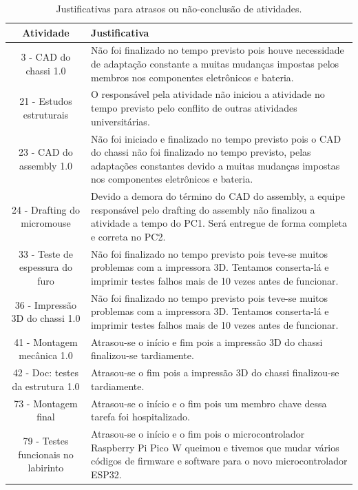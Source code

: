 \begin{landscape}
\clearpage
\begin{table}[htpb]
\begin{center}
\caption{Justificativas para atrasos ou não-conclusão de atividades.}
\begin{tabular}{|c|p{15cm}|} \hline
\textbf{Atividade} & \textbf{Justificativa}  \\ \hline 
    3 - CAD do chassi 1.0 &
    Não foi finalizado no tempo previsto pois houve necessidade de adaptação constante a muitas mudanças impostas pelos membros nos componentes eletrônicos e bateria.\\ \hline
    21 - Estudos estruturais &
    O responsável pela atividade não iniciou a atividade no tempo previsto pelo conflito de outras atividades universitárias. \\ \hline
    23 - CAD do assembly 1.0 &
    Não foi iniciado e finalizado no tempo previsto pois o CAD do chassi não foi finalizado no tempo previsto, pelas adaptações constantes devido a muitas mudanças impostas nos componentes eletrônicos e bateria. \\ \hline
    24 - Drafting do micromouse &
    Devido a demora do término do CAD do assembly, a equipe responsável pelo drafting do assembly não finalizou a atividade a tempo do PC1. Será entregue de forma completa e correta no PC2. \\ \hline
    33 - Teste de espessura do furo &
    Não foi finalizado no tempo previsto pois teve-se muitos problemas com a impressora 3D. Tentamos conserta-lá e imprimir testes falhos mais de 10 vezes antes de funcionar. \\ \hline
    36 - Impressão 3D do chassi 1.0 &
    Não foi finalizado no tempo previsto pois teve-se muitos problemas com a impressora 3D. Tentamos conserta-lá e imprimir testes falhos mais de 10 vezes antes de funcionar.  \\ \hline
    41 - Montagem mecânica 1.0 &
    Atrasou-se o início e fim pois a impressão 3D do chassi finalizou-se tardiamente. \\ \hline
    42 - Doc: testes da estrutura 1.0 &
    Atrasou-se o fim pois a impressão 3D do chassi finalizou-se tardiamente. \\ \hline
    73 - Montagem final &
    Atrasou-se o início e o fim pois um membro chave dessa tarefa foi hospitalizado. \\ \hline
    79 - Testes funcionais no labirinto &
    Atrasou-se o início e o fim pois o microcontrolador Raspberry Pi Pico W queimou e tivemos que mudar vários códigos de firmware e software para o novo microcontrolador ESP32. \\ \hline
    
\end{tabular}
\end{center}
\end{table}




\end{landscape}
